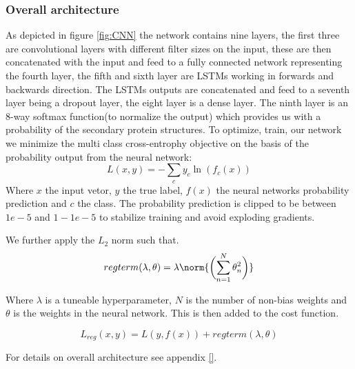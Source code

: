 \documentclass{article}
\begin{document}
\subsubsection{Overall architecture}
\label{sssec:overallarchitecture}
As depicted in figure \ref{fig:CNN} the network contains nine layers, the first three are convolutional layers with different filter sizes on the input, these are then concatenated with the input and feed to a fully connected network representing the fourth layer, the fifth and sixth layer are LSTMs working in forwards and backwards direction. The LSTMs outputs are concatenated and feed to a seventh layer being a dropout layer, the eight layer is a dense layer. The ninth layer is an 8-way softmax function(to normalize the output) which provides us with a probability of the secondary protein structures. To optimize, train, our network we minimize the multi class cross-entrophy objective on the basis of the probability output from the neural network:
\begin{equation}
L(x, y) = -\sum_c y_c \ln(f_c(x))
\end{equation}
Where $x$ the input vetor, $y$ the true label, $f(x)$ the neural networks probability prediction and $c$ the class. The probability prediction is clipped to be between $1e-5$ and $1 - 1e-5$ to stabilize training and avoid exploding gradients.

We further apply the $L_2$ norm such that.
\begin{equation}
regterm(\lambda, \theta) = \lambda \norm{ \biggl(\sum_{n=1}^N \mathbf{\theta}^2_{n}\biggr) }
\end{equation}

Where $\lambda$ is a tuneable hyperparameter, $N$ is the number of non-bias weights and $\theta$ is the weights in the neural network. This is then added to the cost function.

\begin{equation}
L_{reg}(x, y) = L(y, f(x)) + regterm(\lambda, \theta)
\end{equation}

For details on overall architecture see appendix \ref{}.
\end{document}
